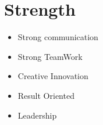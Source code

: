 \documentclass[letterpaper,11pt]{article}
\newcommand{\resumeSubHeadingListStart}{\begin{itemize}[leftmargin=0.0in, label={}]}
\newcommand{\resumeSubHeadingListEnd}{\end{itemize}}
\begin{document}
\section{Strength}
    \resumeSubHeadingListStart
        \begin{multicols}{4}
            \begin{itemize}[itemsep=-5pt, parsep=3pt]
                \item Strong communication
                \item Strong TeamWork
                \item Creative Innovation 
                \item Result Oriented 
                \item Leadership
            \end{itemize}
        \end{multicols}
        \vspace*{2.0\multicolsep}
    \resumeSubHeadingListEnd
\end{document}
